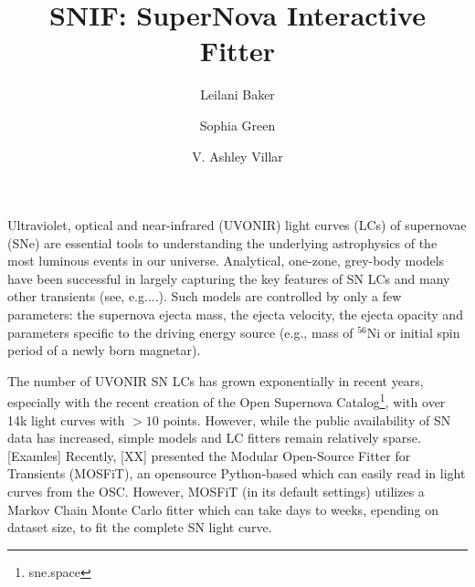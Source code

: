 \documentclass[RNAAS]{aastex62}
\begin{document}
\title{SNIF: SuperNova Interactive Fitter}
\author{Leilani Baker}

\author{Sophia Green}

\author[0000-0002-5814-4061]{V. Ashley Villar}

\section{}


Ultraviolet, optical and near-infrared (UVONIR) light curves (LCs) of supernovae (SNe) are essential tools to understanding the underlying astrophysics of the most luminous events in our universe. Analytical, one-zone, grey-body models have been successful in largely capturing the key features of SN LCs and many other transients (see, e.g....). Such models are controlled by only a few parameters: the supernova ejecta mass, the ejecta velocity, the ejecta opacity and parameters specific to the driving energy source (e.g., mass of $^{56}$Ni or initial spin period of a newly born magnetar).

The number of UVONIR SN LCs has grown exponentially in recent years, especially with the recent creation of the Open Supernova Catalog\footnote{sne.space}, with over 14k light curves with $>10$ points. However, while the public availability of SN data has increased, simple models and LC fitters remain relatively sparse. [Examles] Recently, [XX] presented the Modular Open-Source Fitter for Transients (MOSFiT), an opensource Python-based which can easily read in light curves from the OSC. However, MOSFiT (in its default settings) utilizes a Markov Chain Monte Carlo fitter which can take days to weeks, epending on dataset size, to fit the complete SN light curve. 
\end{document}
